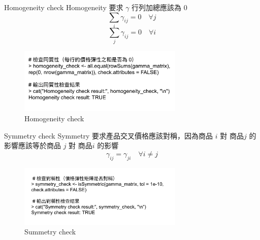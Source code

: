 \documentclass[12pt]{beamer}
\begin{document}
\begin{frame}{Homogeneity check}
	Homogeneity 要求 $\gamma$ 行列加總應該為 0
	\[
		\sum_i \gamma_{ij} = 0 \quad \forall j
	\]
	\[
		\sum_j \gamma_{ij} = 0 \quad \forall i
	\]
	\begin{figure}
		\centering
		\includegraphics[width=0.7\textwidth]{figures/homogeneity.png}
		\caption{Homogeneity check}
	\end{figure}
\end{frame}

\begin{frame}{Symmetry check}
	Symmetry 要求產品交叉價格應該對稱，因為商品 $i$ 對 商品$j$ 的影響應該等於商品 $j$ 對 商品$i$ 的影響
	\[
		\gamma_{ij} = \gamma_{ji} \quad \forall i \neq j
	\]
	\begin{figure}
		\centering
		\includegraphics[width=0.7\textwidth]{figures/symmetry.png}
		\caption{Summetry check}
	\end{figure}
\end{frame}




\end{document}
